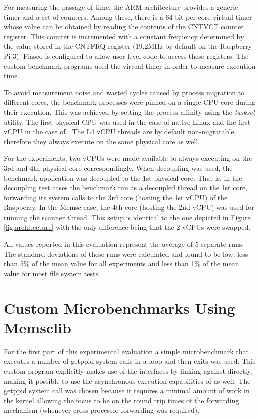 For measuring the passage of time, the ARM architecture provides a generic
timer and a set of counters. Among these, there is a 64-bit per-core virtual
timer whose value can be obtained by reading the contents of the CNTVCT counter
register. This counter is incremented with a constant frequency determined by
the value stored in the CNTFRQ register (19.2MHz by default on the Raspberry Pi
3). Fiasco is configured to allow user-level code to access these registers.
The custom benchmark programs used the virtual timer in order to measure
execution time.

To avoid measurement noise and wasted cycles caused by process migration to
different cores, the benchmark processes were pinned on a single CPU core
during their execution. This was achieved by setting the process affinity using
the \emph{taskset} utility. The first physical CPU was used in the case of
native Linux and the first vCPU in the case of \llinux.  The L4 vCPU threads
are by default non-migratable, therefore they always execute on the same
physical core as well.

For the \llinux experiments, two vCPUs were made available to \llinux always
executing on the 3rd and 4th physical core correspondingly. When decoupling was
used, the benchmark application was decoupled to the 1st physical core. That
is, in the decoupling test cases the benchmark ran as a decoupled thread on the
1st core, forwarding its system calls to the 3rd core (hosting the 1st vCPU) of
the Raspberry. In the Memsc case, the 4th core (hosting the 2nd vCPU) was used
for running the scanner thread. This setup is identical to the one depicted in
Figure \ref{fig:architecture} with the only difference being that the 2 vCPUs
were swapped.

All values reported in this evaluation represent the average of 5 separate
runs. The standard deviations of these runs were calculated and found to be
low; less than 5\% of the mean value for all experiments and less than 1\% of
the mean value for most file system tests.

\section{Custom Microbenchmarks Using Memsclib}

For the first part of this experimental evaluation a simple microbenchmark that
executes a number of getppid system calls in a loop and then exits was used.
This custom program explicitly makes use of the \memsc interfaces by linking
against \lib directly, making it possible to use the asynchronous execution
capabilities of \memsc as well. The getppid system call was chosen because it
requires a minimal amount of work in the kernel allowing the focus to be on the
round trip times of the forwarding mechanism (whenever cross-processor
forwarding was required).

